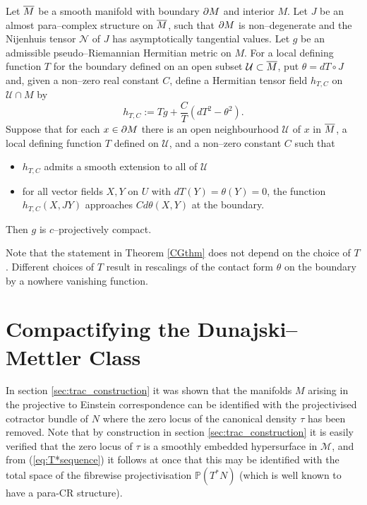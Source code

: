 \begin{theo}[\cite{CG}] \label{CGthm}
Let $\overline{M}$ be a smooth manifold with boundary $\partial M$ and interior $M$. Let $J$ be an almost para--complex structure on $\overline{M}$, such that $\partial M$ is non--degenerate and the Nijenhuis tensor $\mathcal{N}$ of $J$ has asymptotically tangential values. Let $g$ be an admissible pseudo--Riemannian Hermitian metric on $M$. For a local defining function $T$ for the boundary defined on an open 
subset ${\mathcal U}\subset \overline{M}$, put $\theta=dT\circ J$ and, given a non--zero real 
constant $C$, define a Hermitian tensor field $h_{T,C}$ on 
${\mathcal U}\cap M$ by
\[
h_{T,C}:=Tg+\frac{C}{T}(dT^2-\theta^2).
\]
Suppose that for each $x\in\partial M$ there is an open neighbourhood 
${\mathcal{U}}$ of $x$ in $\overline{M}$, a local defining function $T$ defined on 
${\mathcal{U}}$, and a non--zero constant $C$ such that
\begin{itemize}
\item $h_{T,C}$ admits a smooth extension to all of $\mathcal{U}$
\item for all vector fields $X,Y$ on $U$ with $dT(Y)=\theta(Y)=0$, the function $h_{T,C}(X,JY)$ approaches $Cd\theta(X,Y)$ at the boundary.
\end{itemize}
Then $g$ is $c$--projectively compact.
\end{theo}
Note that the statement in  Theorem \ref{CGthm} does not depend on the choice of $T$. Different choices of $T$ result in rescalings of the contact form $\theta$ on the boundary by a nowhere vanishing function.


\section{Compactifying the Dunajski--Mettler Class} 

In section \ref{sec:trac_construction} it was shown that the manifolds $M$ arising in the projective to Einstein correspondence can be identified with the projectivised cotractor bundle of $N$ where the zero locus of the canonical density $\tau$ has been removed. Note that by construction in section \ref{sec:trac_construction} it is easily verified that the zero locus of $\tau$ is a smoothly embedded hypersurface in $\mathcal{M}$,  and from (\ref{eq:T*sequence}) it follows at once that this may be identified with the total space of the fibrewise projectivisation $\mathbb{P}(T^*N)$ (which is well known to have a para-CR structure). 

